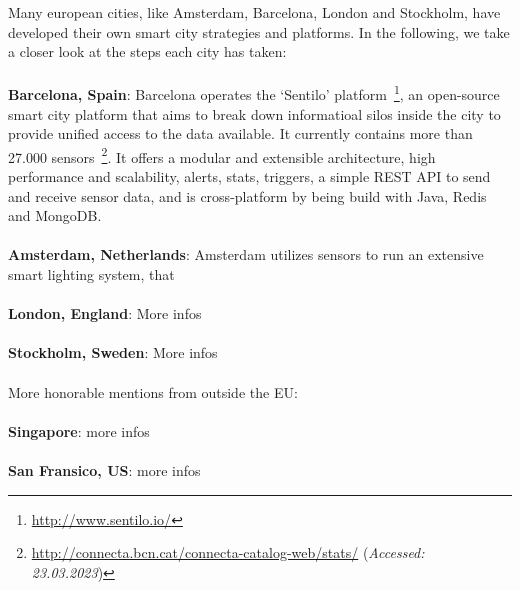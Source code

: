 Many european cities, like Amsterdam, Barcelona, London and Stockholm, have developed their own smart city strategies and platforms. In the following, we take a closer look at the steps each city has taken:\\
\\
\textbf{Barcelona, Spain}: Barcelona operates the `Sentilo' platform~\footnote{\url{http://www.sentilo.io/}}, an open-source smart city platform that aims to break down informatioal silos inside the city to provide unified access to the data available. It currently contains more than 27.000 sensors~\footnote{\url{http://connecta.bcn.cat/connecta-catalog-web/stats/} (\textit{Accessed: 23.03.2023})}. It offers a modular and extensible architecture, high performance and scalability, alerts, stats, triggers, a simple REST API to send and receive sensor data, and is cross-platform by being build with Java, Redis and MongoDB.\\
\\
\textbf{Amsterdam, Netherlands}: Amsterdam utilizes sensors to run an extensive smart lighting system, that\\
\\
\textbf{London, England}: More infos\\
\\
\textbf{Stockholm, Sweden}: More infos\\
\\
More honorable mentions from outside the EU:\\
\\
\textbf{Singapore}: more infos\\
\\
\textbf{San Fransico, US}: more infos\\
